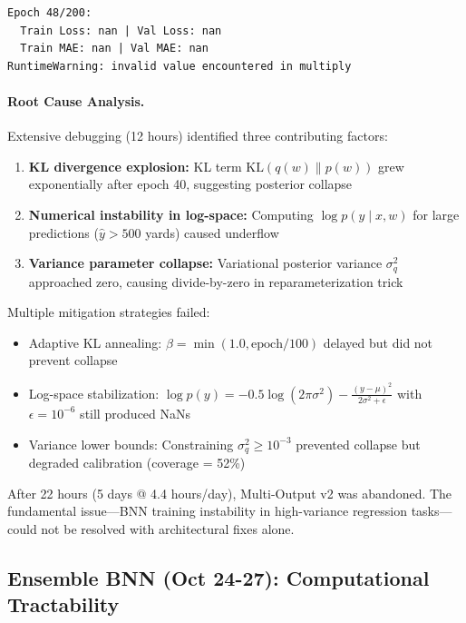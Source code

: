 \begin{verbatim}
Epoch 48/200:
  Train Loss: nan | Val Loss: nan
  Train MAE: nan | Val MAE: nan
RuntimeWarning: invalid value encountered in multiply
\end{verbatim}

\paragraph{Root Cause Analysis.}
Extensive debugging (12 hours) identified three contributing factors:

\begin{enumerate}[itemsep=2pt,parsep=0pt]
    \item \textbf{KL divergence explosion:} KL term $\text{KL}(q(w) \| p(w))$ grew exponentially after epoch 40, suggesting posterior collapse
    \item \textbf{Numerical instability in log-space:} Computing $\log p(y \mid x, w)$ for large predictions ($\hat{y} > 500$ yards) caused underflow
    \item \textbf{Variance parameter collapse:} Variational posterior variance $\sigma^2_q$ approached zero, causing divide-by-zero in reparameterization trick
\end{enumerate}

Multiple mitigation strategies failed:
\begin{itemize}[itemsep=2pt,parsep=0pt]
    \item Adaptive KL annealing: $\beta = \min(1.0, \text{epoch} / 100)$ delayed but did not prevent collapse
    \item Log-space stabilization: $\log p(y) = -0.5 \log(2\pi\sigma^2) - \frac{(y - \mu)^2}{2\sigma^2 + \epsilon}$ with $\epsilon = 10^{-6}$ still produced NaNs
    \item Variance lower bounds: Constraining $\sigma^2_q \geq 10^{-3}$ prevented collapse but degraded calibration (coverage = 52\%)
\end{itemize}

After 22 hours (5 days @ 4.4 hours/day), Multi-Output v2 was abandoned. The fundamental issue---BNN training instability in high-variance regression tasks---could not be resolved with architectural fixes alone.

\subsection{Ensemble BNN (Oct 24-27): Computational Tractability}

